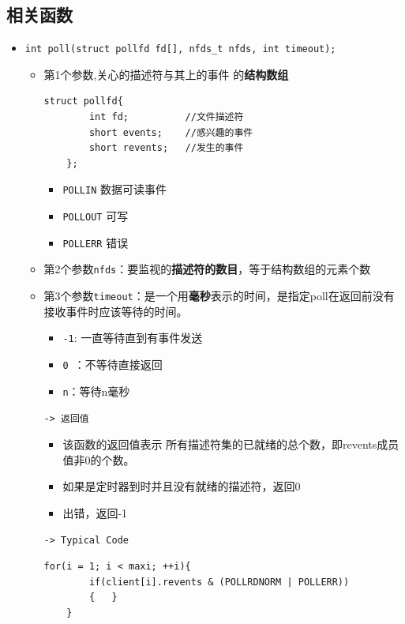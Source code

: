 \documentclass[UTF8,a4paper,12pt]{ctexbook}
\begin{document}
		\subsection{相关函数}
			\begin{itemize}
				\item \verb|int poll(struct pollfd fd[], nfds_t nfds, int timeout);|
					\begin{itemize}[itemindent = 1em]
						\item 第1个参数,关心的描述符与其上的事件 的\textbf{结构数组}
							\begin{lstlisting}[frame=L]
	struct pollfd{
		int fd;          //文件描述符
		short events;    //感兴趣的事件
		short revents;   //发生的事件
	};
							\end{lstlisting}
							\begin{itemize}
								\item \verb|POLLIN| 数据可读事件
								\item \verb|POLLOUT| 可写
								\item \verb|POLLERR| 错误
							\end{itemize}
						\item 第2个参数\verb|nfds|：要监视的\textbf{描述符的数目}，等于结构数组的元素个数
						\item 第3个参数\verb|timeout|：是一个用\textbf{毫秒}表示的时间，是指定poll在返回前没有接收事件时应该等待的时间。
							\begin{itemize}[itemindent = 1em]
								\item \verb|-1|: 一直等待直到有事件发送
								\item \verb|0 |：不等待直接返回
								\item \verb|n|：等待n毫秒
							\end{itemize}
						
						\verb|-> 返回值|
							\begin{itemize}
								\item 该函数的返回值表示 所有描述符集的已就绪的总个数，即revents成员值非0的个数。
								\item 如果是定时器到时并且没有就绪的描述符，返回0
								\item 出错，返回-1
								\end{itemize}
								
						\verb|-> Typical Code|
						\begin{lstlisting}[frame=L]
	for(i = 1; i < maxi; ++i){
		if(client[i].revents & (POLLRDNORM | POLLERR))
		{	}
	}
						\end{lstlisting}
					\end{itemize}
			\end{itemize}
\end{document}
